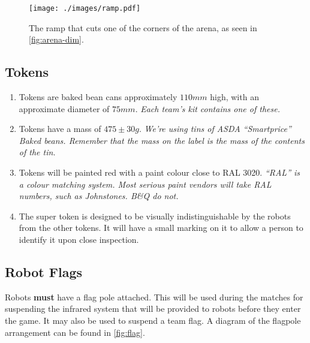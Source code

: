 \begin{figure}
  \begin{center}
    \texttt{[image: ./images/ramp.pdf]}
  \end{center}
  \caption{\label{fig:ramp-on-its-own}The ramp that cuts one of the corners of the arena, as seen in \autoref{fig:arena-dim}.}
\end{figure}

\subsection{Tokens}
\label{sub:Tokens}
\begin {enumerate}
\item Tokens are baked bean cans approximately $110mm$ high, with an approximate diameter of $75mm$.
\emph{Each team's kit contains one of these.}
\item Tokens have a mass of $475\pm30g$.  \emph{We're using tins of ASDA ``Smartprice'' Baked beans.  Remember that the mass on the label is the mass of the contents of the tin.}
\item Tokens will be painted red with a paint colour close to RAL 3020.  \emph{``RAL'' is  a colour matching system.  Most serious paint vendors will take RAL numbers, such as Johnstones.  B\&Q do not.}

\item The super token is designed to be visually indistinguishable by the robots from the other tokens.  It will have a small marking on it to allow a person to identify it upon close inspection.
\end {enumerate}

\subsection{Robot Flags}
\label{sub:Flags}

Robots \textbf{must} have a flag pole attached.  This will be used during the matches for suspending the infrared system that will be provided to robots before they enter the game.  It may also be used to suspend a team flag.  A diagram of the flagpole arrangement can be found in \autoref{fig:flag}.

